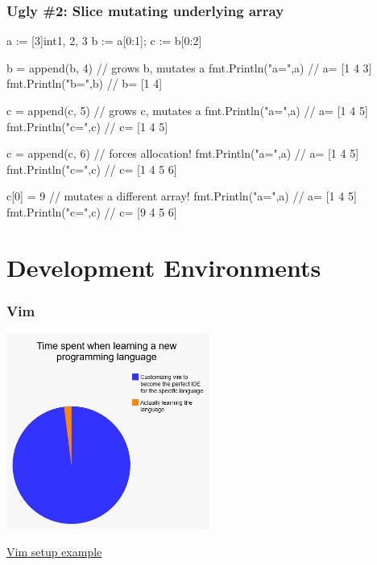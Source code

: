 \documentclass[handout,compress,t,11pt]{beamer}
\begin{document}
\begin{frame}[fragile]
    \frametitle{Ugly \#2: Slice mutating underlying array}
\begin{golang}
a := [3]int{1, 2, 3}
b := a[0:1]; c := b[0:2]

b = append(b, 4)      // grows b, mutates a
fmt.Println("a=",a)   // a= [1 4 3]
fmt.Println("b=",b)   // b= [1 4]

c = append(c, 5)      // grows c, mutates a
fmt.Println("a=",a)   // a= [1 4 5]
fmt.Println("c=",c)   // c= [1 4 5]

c = append(c, 6)      // forces allocation!
fmt.Println("a=",a)   // a= [1 4 5]
fmt.Println("c=",c)   // c= [1 4 5 6]

c[0] = 9              // mutates a different array!
fmt.Println("a=",a)   // a= [1 4 5]
fmt.Println("c=",c)   // c= [9 4 5 6]
\end{golang}
\end{frame}



\section{Development Environments}

\begin{frame}[fragile]
    \frametitle{Vim}
    \begin{center}
    \includegraphics[width=0.5\textwidth]{vim-ide-joke.jpg}
    \end{center}
    \href{https://tpaschalis.github.io/vim-go-setup/}{Vim setup example}
\end{frame}
\end{document}
